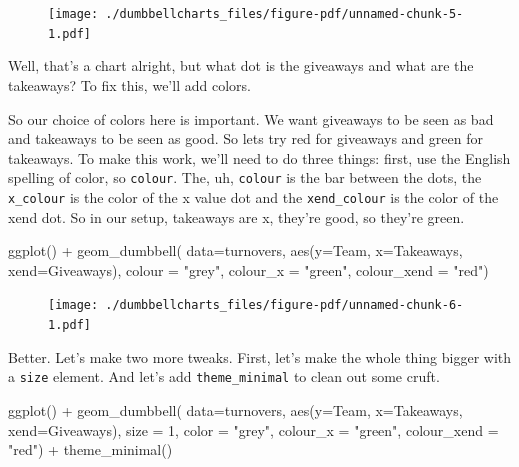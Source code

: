 \documentclass[
  letterpaper,
  DIV=11,
  numbers=noendperiod]{scrreprt}
\newenvironment{Shaded}{\begin{snugshade}}{\end{snugshade}}
\newcommand{\AttributeTok}[1]{\textcolor[rgb]{0.40,0.45,0.13}{#1}}
\newcommand{\DecValTok}[1]{\textcolor[rgb]{0.68,0.00,0.00}{#1}}
\newcommand{\FunctionTok}[1]{\textcolor[rgb]{0.28,0.35,0.67}{#1}}
\newcommand{\NormalTok}[1]{\textcolor[rgb]{0.00,0.23,0.31}{#1}}
\newcommand{\SpecialCharTok}[1]{\textcolor[rgb]{0.37,0.37,0.37}{#1}}
\newcommand{\StringTok}[1]{\textcolor[rgb]{0.13,0.47,0.30}{#1}}
\begin{document}
\begin{figure}[H]

{\centering \texttt{[image: ./dumbbellcharts\_files/figure-pdf/unnamed-chunk-5-1.pdf]}

}

\end{figure}

Well, that's a chart alright, but what dot is the giveaways and what are
the takeaways? To fix this, we'll add colors.

So our choice of colors here is important. We want giveaways to be seen
as bad and takeaways to be seen as good. So lets try red for giveaways
and green for takeaways. To make this work, we'll need to do three
things: first, use the English spelling of color, so \texttt{colour}.
The, uh, \texttt{colour} is the bar between the dots, the
\texttt{x\_colour} is the color of the x value dot and the
\texttt{xend\_colour} is the color of the xend dot. So in our setup,
takeaways are x, they're good, so they're green.

\begin{Shaded}
\begin{Highlighting}[]
\FunctionTok{ggplot}\NormalTok{() }\SpecialCharTok{+} 
  \FunctionTok{geom\_dumbbell}\NormalTok{(}
    \AttributeTok{data=}\NormalTok{turnovers, }
    \FunctionTok{aes}\NormalTok{(}\AttributeTok{y=}\NormalTok{Team, }\AttributeTok{x=}\NormalTok{Takeaways, }\AttributeTok{xend=}\NormalTok{Giveaways),}
    \AttributeTok{colour =} \StringTok{"grey"}\NormalTok{,}
    \AttributeTok{colour\_x =} \StringTok{"green"}\NormalTok{,}
    \AttributeTok{colour\_xend =} \StringTok{"red"}\NormalTok{)}
\end{Highlighting}
\end{Shaded}

\begin{figure}[H]

{\centering \texttt{[image: ./dumbbellcharts\_files/figure-pdf/unnamed-chunk-6-1.pdf]}

}

\end{figure}

Better. Let's make two more tweaks. First, let's make the whole thing
bigger with a \texttt{size} element. And let's add
\texttt{theme\_minimal} to clean out some cruft.

\begin{Shaded}
\begin{Highlighting}[]
\FunctionTok{ggplot}\NormalTok{() }\SpecialCharTok{+} 
  \FunctionTok{geom\_dumbbell}\NormalTok{(}
    \AttributeTok{data=}\NormalTok{turnovers, }
    \FunctionTok{aes}\NormalTok{(}\AttributeTok{y=}\NormalTok{Team, }\AttributeTok{x=}\NormalTok{Takeaways, }\AttributeTok{xend=}\NormalTok{Giveaways),}
    \AttributeTok{size =} \DecValTok{1}\NormalTok{,}
    \AttributeTok{color =} \StringTok{"grey"}\NormalTok{,}
    \AttributeTok{colour\_x =} \StringTok{"green"}\NormalTok{,}
    \AttributeTok{colour\_xend =} \StringTok{"red"}\NormalTok{) }\SpecialCharTok{+} 
  \FunctionTok{theme\_minimal}\NormalTok{()}
\end{Highlighting}
\end{Shaded}
\end{document}
